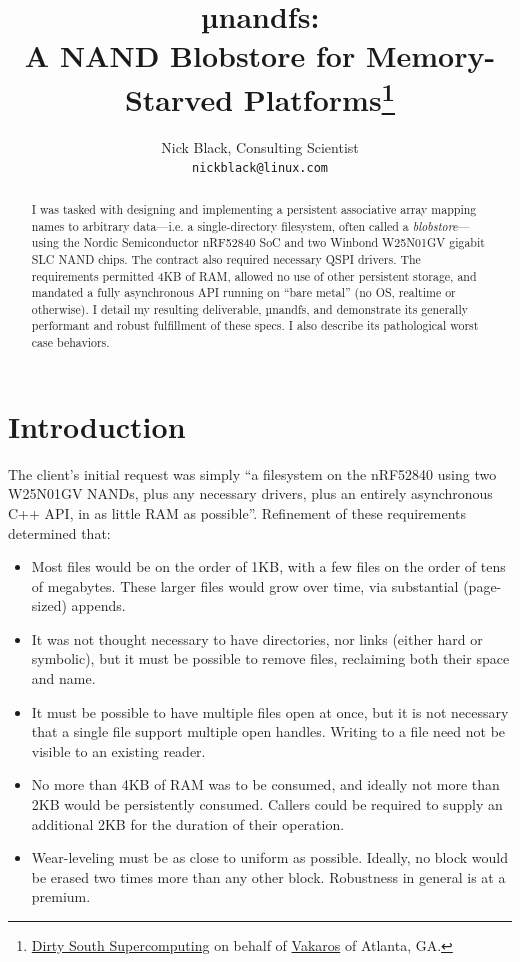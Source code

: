 \documentclass[letterpaper,10pt]{article}
\title{µnandfs:\\
A NAND Blobstore for Memory-Starved Platforms\thanks{
 \href{https://www.dsscaw.com/}{Dirty South Supercomputing} on behalf
 of \href{https://www.vakaros.com/}{Vakaros} of Atlanta, GA.
}\\
}
\author{Nick Black, Consulting Scientist\\
\texttt{nickblack@linux.com}
}
\newenvironment{denseitemize}{
  \begin{itemize}
      \setlength{\itemsep}{0pt}
}{
  \end{itemize}
}
\begin{document}
\maketitle
\thispagestyle{fancy}
\date{}
\begin{abstract}
I was tasked with designing and implementing a persistent associative array
mapping names to arbitrary data---i.e. a single-directory filesystem, often
called a \textit{blobstore}---using the Nordic Semiconductor nRF52840 SoC and
two Winbond W25N01GV gigabit SLC NAND chips. The contract also required
necessary QSPI drivers. The requirements permitted 4KB of RAM, allowed no use
of other persistent storage, and mandated a fully asynchronous API running on
``bare metal'' (no OS, realtime or otherwise). I detail my resulting
deliverable, µnandfs, and demonstrate its generally performant and robust
fulfillment of these specs. I also describe its pathological worst case
behaviors.
\end{abstract}
\section{Introduction}
The client's initial request was simply ``a filesystem on the nRF52840 using
two W25N01GV NANDs, plus any necessary drivers, plus an entirely asynchronous
C++ API, in as little RAM as possible''. Refinement of these requirements
determined that:
\begin{denseitemize}
\item Most files would be on the order of 1KB, with a few files
       on the order of tens of megabytes. These larger files would grow
       over time, via substantial (page-sized) appends.
\item It was not thought necessary to have directories, nor links (either hard
       or symbolic), but it must be possible to remove files, reclaiming both
       their space and name.
\item It must be possible to have multiple files open at once, but it is not
       necessary that a single file support multiple open handles. Writing
       to a file need not be visible to an existing reader.
\item No more than 4KB of RAM was to be consumed, and ideally not more than 2KB
       would be persistently consumed. Callers could be required to supply
       an additional 2KB for the duration of their operation.
\item Wear-leveling must be as close to uniform as possible. Ideally, no block
       would be erased two times more than any other block. Robustness in
       general is at a premium.
\end{denseitemize}
\end{document}
